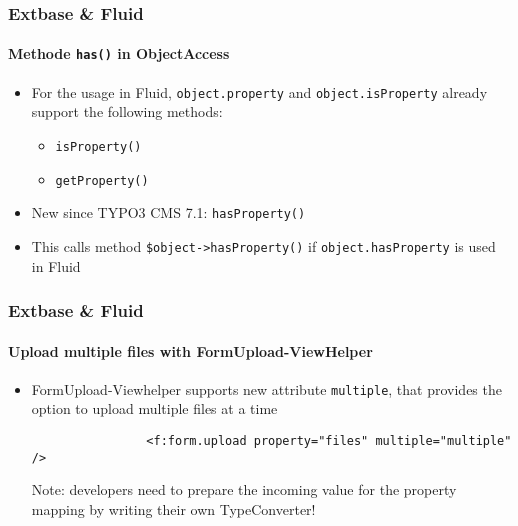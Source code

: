 \begin{frame}[fragile]
	\frametitle{Extbase \& Fluid}
	\framesubtitle{Methode \texttt{has()} in ObjectAccess}

	\begin{itemize}

		\item For the usage in Fluid, \texttt{object.property} and \texttt{object.isProperty} already
			support the following methods:

			\begin{itemize}
				\item \texttt{isProperty()}
				\item \texttt{getProperty()}
			\end{itemize}

		\item New since TYPO3 CMS 7.1: \texttt{hasProperty()}
		\item This calls method \texttt{\$object->hasProperty()}\newline
			if \texttt{object.hasProperty} is used in Fluid

	\end{itemize}

\end{frame}


\begin{frame}[fragile]
	\frametitle{Extbase \& Fluid}
	\framesubtitle{Upload multiple files with FormUpload-ViewHelper}

	\begin{itemize}

		\item FormUpload-Viewhelper supports new attribute \texttt{multiple}, that provides the
			option to upload multiple files at a time

			\begin{lstlisting}
				<f:form.upload property="files" multiple="multiple" />
			\end{lstlisting}

			\vspace{0.2cm}

			\begingroup
				\color{red}
					Note: developers need to prepare the incoming value for the property mapping by
					writing their own TypeConverter!
			\endgroup

	\end{itemize}

\end{frame}

